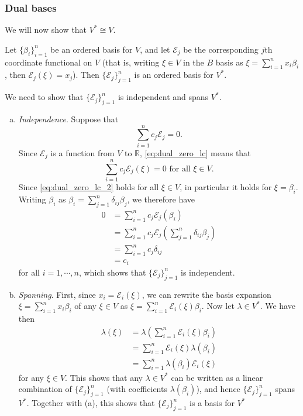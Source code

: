 \documentclass[12pt,letterpaper,reqno]{article}
\numberwithin{equation}{section}
\newcommand{\ti}[1]{\textit{#1}}
\begin{document}
\subsubsection{Dual bases}
We will now show that $V^* \cong V$.

\begin{thm}\label{thm:dual_basis}
	Let $\{\beta_i\}_{i=1}^n$ be an ordered basis for $V$, and let $\mathscr{E}_j$ be the corresponding $j$th coordinate functional on $V$ (that is, writing $\xi \in V$ in the $B$ basis as $\xi=\sum_{i=1}^nx_i\beta_i$, then $\mathscr{E}_j(\xi)=x_j$). Then $\{\mathscr{E}_j\}_{j=1}^n$ is an ordered basis for $V^*$.
\end{thm}

\begin{pf}
We need to show that $\{\mathscr{E}_j\}_{j=1}^n$ is independent and spans $V^*$.
	\begin{enumerate}[(a)]
		\item \ti{Independence}. Suppose that 
		\begin{equation}\label{eq:dual_zero_lc}
			\sum_{i=1}^nc_j\mathscr{E}_j=0.	
		\end{equation} 
	 Since $\mathscr{E}_j$ is a function from $V$ to $\mathbb{R}$, \eqref{eq:dual_zero_lc} means that
\begin{equation}\label{eq:dual_zero_lc_2}
	\sum_{i=1}^nc_j\mathscr{E}_j(\xi)=0 \text{ for all } \xi \in V.
\end{equation}
Since \eqref{eq:dual_zero_lc_2} holds for all $\xi \in V$, in particular it holds for $\xi=\beta_i$. Writing $\beta_i$ as $\beta_i=\sum_{j=1}^n\delta_{ij}\beta_j$, we therefore have
\begin{equation}
	\begin{split}
		0&=\sum_{i=1}^nc_j\mathscr{E}_j(\beta_i) \\ 
		&=\sum_{i=1}^nc_j\mathscr{E}_j(\sum_{j=1}^n\delta_{ij}\beta_j) \\
		&=\sum_{i=1}^nc_j\delta_{ij} \\
		&=c_i
	\end{split}
\end{equation}
for all $i=1,\cdots,n$, which shows that $\{\mathscr{E}_j\}_{j=1}^n$ is independent.
\item \ti{Spanning}. First, since $x_i=\mathscr{E}_i(\xi)$, we can rewrite the basis expansion $\xi=\sum_{i=1}^nx_i\beta_i$ of any $\xi \in V$ as $\xi=\sum_{i=1}^n\mathscr{E}_i(\xi)\beta_i$. Now let $\lambda \in V^*$. We have then 
\begin{align*}
	\lambda(\xi)&=\lambda(\sum_{i=1}^n\mathscr{E}_i(\xi)\beta_i) \\
	&=\sum_{i=1}^n\mathscr{E}_i(\xi)\lambda(\beta_i) \\
	&=\sum_{i=1}^n\lambda(\beta_i)\mathscr{E}_i(\xi) 
\end{align*}
for any $\xi \in V$. This shows that any $\lambda \in V^*$ can be written as a linear combination of $\{\mathscr{E}_j\}_{j=1}^n$ (with coefficients $\lambda(\beta_i)$), and hence $\{\mathscr{E}_j\}_{j=1}^n$ spans $V^*$. Together with (a), this shows that $\{\mathscr{E}_j\}_{j=1}^n$ is a basis for $V^*$ 
	\end{enumerate}
\end{pf}
\end{document}
